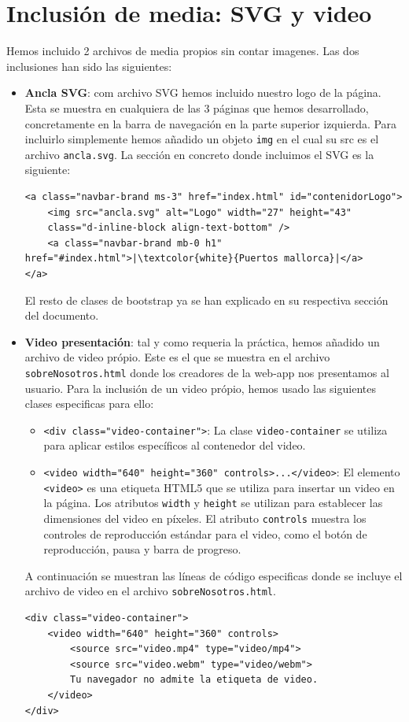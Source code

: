 \documentclass{article}
\begin{document}
\section{Inclusión de media: SVG y video}
Hemos incluido 2 archivos de media propios sin contar imagenes. Las dos inclusiones han sido las siguientes:
\begin{itemize}
    \item \textbf{Ancla SVG}: com archivo SVG hemos incluido nuestro logo de la página. Esta se muestra en cualquiera de las 3 páginas que hemos desarrollado, concretamente en la barra de navegación en la parte superior izquierda. Para incluirlo simplemente hemos añadido un objeto \texttt{img} en el cual su src es el archivo \texttt{ancla.svg}. La sección en concreto donde incluimos el SVG es la siguiente:
    \begin{verbatim}
<a class="navbar-brand ms-3" href="index.html" id="contenidorLogo">
    <img src="ancla.svg" alt="Logo" width="27" height="43" 
    class="d-inline-block align-text-bottom" />
    <a class="navbar-brand mb-0 h1" href="#index.html">|\textcolor{white}{Puertos mallorca}|</a>
</a>
    \end{verbatim}
El resto de clases de bootstrap ya se han explicado en su respectiva sección del documento.
    \item \textbf{Video presentación}: tal y como requeria la práctica, hemos añadido un archivo de video própio. Este es el que se muestra en el archivo \texttt{sobreNosotros.html} donde los creadores de la web-app nos presentamos al usuario. Para la inclusión de un video própio, hemos usado las siguientes clases especificas para ello:
    \begin{itemize}
        \item \texttt{<div class="video-container">}: La clase \texttt{video-container} se utiliza para aplicar estilos específicos al contenedor del video.
            
        \item \texttt{<video width="640" height="360" controls>...</video>}: El elemento \texttt{<video>} es una etiqueta HTML5 que se utiliza para insertar un video en la página. Los atributos \texttt{width} y \texttt{height} se utilizan para establecer las dimensiones del video en píxeles. El atributo \texttt{controls} muestra los controles de reproducción estándar para el video, como el botón de reproducción, pausa y barra de progreso.
    \end{itemize}
    A continuación se muestran las líneas de código especificas donde se incluye el archivo de video en el archivo \texttt{sobreNosotros.html}.
    \begin{verbatim}
<div class="video-container">
    <video width="640" height="360" controls>
        <source src="video.mp4" type="video/mp4">
        <source src="video.webm" type="video/webm">
        Tu navegador no admite la etiqueta de video.
    </video>
</div>
    \end{verbatim}
\end{itemize}
\end{document}
